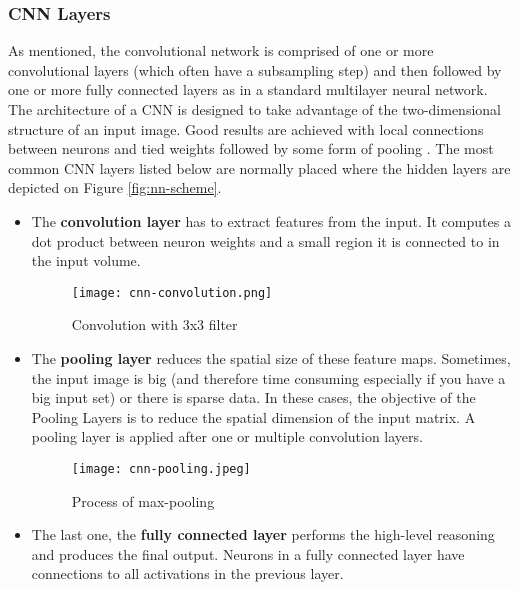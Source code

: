 \documentclass[../Main.tex]{subfiles}
\begin{document}
    \subsubsection{CNN Layers}
    As mentioned, the convolutional network is comprised of one or more convolutional layers (which often have a subsampling step) and then followed by one or more fully connected layers as in a standard multilayer neural network. The architecture of a CNN is designed to take advantage of the two-dimensional structure of an input image. Good results are achieved with local connections between neurons and tied weights followed by some form of pooling \cite{dlstanford}. The most common CNN layers listed below are normally placed where the hidden layers are depicted on Figure \ref{fig:nn-scheme}. 
    \begin{itemize}
        \item The \textbf{convolution layer} has to extract features from the input. It computes a dot product between neuron weights and a small region it is connected to in the input volume.\\
    \begin{figure}[h!]
        \centering
        \texttt{[image: cnn-convolution.png]}
        \caption{Convolution with 3x3 filter}
        \label{fig:cnn-convolution}
    \end{figure}
    
        \item The \textbf{pooling layer} reduces the spatial size of these feature maps. Sometimes, the input image is big (and therefore time consuming especially if you have a big input set) or there is sparse data. In these cases, the objective of the Pooling Layers is to reduce the spatial dimension of the input matrix. A pooling layer is applied after one or multiple convolution layers.\\
    \begin{figure}[h!]
        \centering
        \texttt{[image: cnn-pooling.jpeg]}
        \caption{Process of max-pooling}
        \label{fig:cnn-pooling}
    \end{figure}
    
        \item The last one, the \textbf{fully connected layer} performs the high-level reasoning and produces the final output. Neurons in a fully connected layer have connections to all activations in the previous layer.
    \end{itemize}
\end{document}
